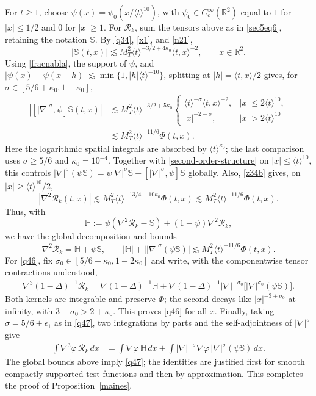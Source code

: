\documentclass[reqno,11pt]{amsart}
\numberwithin{equation}{section}
\begin{document}
For $t\geq1$, choose $\psi(x)=\psi_0(x/\langle t\rangle^{10})$, with
$\psi_0\in C_c^\infty(\mathbb R^2)$ equal to $1$ for $|x|\leq1/2$
and $0$ for $|x|\geq1$.
For $\mathcal R_k$, sum the tensors above as in \eqref{sec5eq6}, retaining
the notation $\mathbb S$. By \eqref{q34}, \eqref{x1}, and \eqref{n21},
\[
|\mathbb S(t,x)|\lesssim M_T^2\langle t\rangle^{-3/2+4\kappa_0}\langle t,x\rangle^{-2},
\qquad x\in\mathbb R^2.
\]
Using \eqref{fracnabla}, the support of $\psi$, and
$|\psi(x)-\psi(x-h)|\lesssim\min\{1,|h|\langle t\rangle^{-10}\}$,
splitting at $|h|=\langle t,x\rangle/2$ gives, for $\sigma\in[5/6+\kappa_0,1-\kappa_0]$,
\begin{align*}
|[|\nabla|^\sigma,\psi]\mathbb S(t,x)|
&\lesssim M_T^2\langle t\rangle^{-3/2+5\kappa_0}
\begin{cases}
\langle t\rangle^{-\sigma}\langle t,x\rangle^{-2},&|x|\leq2\langle t\rangle^{10},\\
|x|^{-2-\sigma},&|x|>2\langle t\rangle^{10}
\end{cases}\\
&\lesssim M_T^2\langle t\rangle^{-11/6}\Phi(t,x).
\end{align*}
Here the logarithmic spatial integrals are absorbed by $\langle t\rangle^{\kappa_0}$;
the last comparison uses $\sigma\geq5/6$ and $\kappa_0=10^{-4}$.
Together with \eqref{second-order-structure}
on $|x|\leq\langle t\rangle^{10}$, this controls
$|\nabla|^\sigma(\psi\mathbb S)
=\psi|\nabla|^\sigma\mathbb S+[|\nabla|^\sigma,\psi]\mathbb S$ globally.
Also, \eqref{z34b} gives, on $|x|\geq\langle t\rangle^{10}/2$,
\[
|\nabla^2\mathcal R_k(t,x)|
\lesssim M_T^2\langle t\rangle^{-13/4+10\kappa_0}\Phi(t,x)
\lesssim M_T^2\langle t\rangle^{-11/6}\Phi(t,x).
\]
Thus, with
\[
\mathbb H:=\psi(\nabla^2\mathcal R_k-\mathbb S)
+(1-\psi)\nabla^2\mathcal R_k,
\]
we have the global decomposition and bounds
\[
\nabla^2\mathcal R_k=\mathbb H+\psi\mathbb S,
\qquad |\mathbb H|+\big||\nabla|^\sigma(\psi\mathbb S)\big|
\lesssim M_T^2\langle t\rangle^{-11/6}\Phi(t,x).
\]
For \eqref{q46}, fix $\sigma_0\in[5/6+\kappa_0,1-2\kappa_0]$ and write,
with the componentwise tensor contractions understood,
\begin{align*}
\nabla^3(1-\Delta)^{-1}\mathcal R_k=\nabla(1-\Delta)^{-1}\mathbb H+\nabla(1-\Delta)^{-1}|\nabla|^{-\sigma_0}
\big[|\nabla|^{\sigma_0}(\psi\mathbb S)\big].
\end{align*}
Both kernels are integrable and preserve $\Phi$; the second decays
like $|x|^{-3+\sigma_0}$ at infinity, with $3-\sigma_0>2+\kappa_0$.
This proves \eqref{q46} for all $x$.
Finally, taking $\sigma=5/6+\epsilon_1$ as in \eqref{q47},
two integrations by parts and the self-adjointness of $|\nabla|^\sigma$ give
\begin{align*}
\int\nabla^3\varphi\,\mathcal R_k\,dx
&=\int\nabla\varphi\,\mathbb H\,dx
+\int |\nabla|^{-\sigma}\nabla\varphi\,
|\nabla|^\sigma(\psi\mathbb S)\,dx.
\end{align*}
The global bounds above imply \eqref{q47}; the identities are justified
first for smooth compactly supported test functions and then by approximation.
This completes the proof of Proposition~\ref{maines}.
\end{document}
